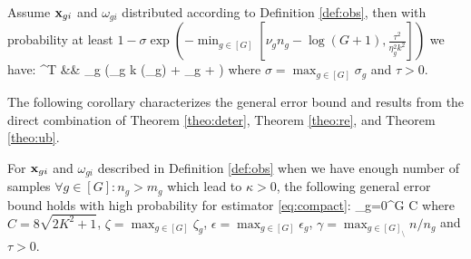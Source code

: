 \begin{theorem}
	\label{theo:ub}
	Assume $\mathbf{x}_{gi}$ and $\omega_{gi}$ distributed according to Definition \ref{def:obs}, then with probability at least  $1 - \sigma \exp\left(-\min_{g \in [G]}\left[\nu_g  n_g - \log (G+1), \frac{\tau^2}{\eta_g^2 k^2}\right]\right) $  we have:
	{\small
	\be
	\nr
	 \oomega ^T \X\ddelta
	&\leq&  \max_{g \in [G]} \left(\zeta_g k \omega(\cA_g) + \epsilon_g + \tau \right) \nr
	\ee
	}
	where $\sigma = \max_{g \in [G]} \sigma_g$ and $\tau > 0$.
\end{theorem}

The following corollary characterizes the general error bound and results from the direct combination of Theorem \ref{theo:deter}, Theorem \ref{theo:re}, and Theorem \ref{theo:ub}.
\begin{corollary}
	\label{corr:calcub}
	For $\mathbf{x}_{gi}$ and $\omega_{gi}$ described in Definition \ref{def:obs} when we have enough number of samples $\forall g \in [G]: n_g > m_g$ which lead to $\kappa > 0$, the following general error bound holds with high probability for estimator \eqref{eq:compact}:
	{\small\be
	\label{eq:general}
	\sum_{g=0}^{G}  
	\leq C {\gamma} 
	\ee	}
	where $C = 8\sqrt{2 K^2 + 1}$, $\zeta = \max_{g \in [G]} \zeta_g$, $\epsilon = \max_{g \in [G]} \epsilon_g$, $\gamma = \max_{g \in [G]_{\setminus}} n/n_g$  and $\tau > 0$.
\end{corollary}



